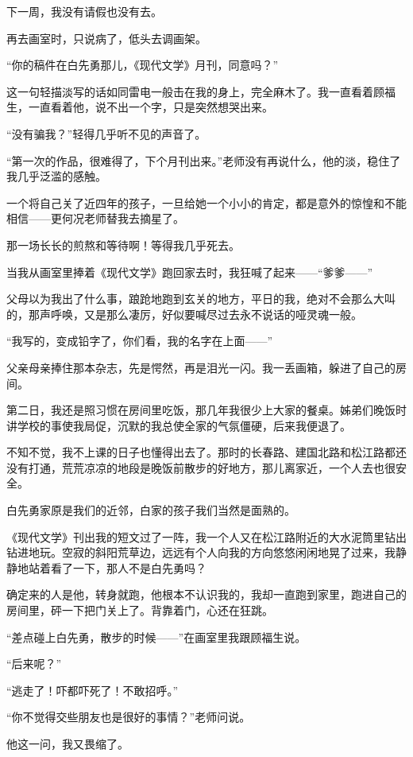 \par 下一周，我没有请假也没有去。
\par 再去画室时，只说病了，低头去调画架。
\par “你的稿件在白先勇那儿，《现代文学》月刊，同意吗？”
\par 这一句轻描淡写的话如同雷电一般击在我的身上，完全麻木了。我一直看着顾福生，一直看着他，说不出一个字，只是突然想哭出来。
\par “没有骗我？”轻得几乎听不见的声音了。
\par “第一次的作品，很难得了，下个月刊出来。”老师没有再说什么，他的淡，稳住了我几乎泛滥的感触。
\par 一个将自己关了近四年的孩子，一旦给她一个小小的肯定，都是意外的惊惶和不能相信——更何况老师替我去摘星了。
\par 那一场长长的煎熬和等待啊！等得我几乎死去。
\par 当我从画室里捧着《现代文学》跑回家去时，我狂喊了起来——“爹爹——”
\par 父母以为我出了什么事，踉跄地跑到玄关的地方，平日的我，绝对不会那么大叫的，那声呼唤，又是那么凄厉，好似要喊尽过去永不说话的哑灵魂一般。
\par “我写的，变成铅字了，你们看，我的名字在上面——”
\par 父亲母亲捧住那本杂志，先是愕然，再是泪光一闪。我一丢画箱，躲进了自己的房间。
\par 第二日，我还是照习惯在房间里吃饭，那几年我很少上大家的餐桌。姊弟们晚饭时讲学校的事使我局促，沉默的我总使全家的气氛僵硬，后来我便退了。
\par 不知不觉，我不上课的日子也懂得出去了。那时的长春路、建国北路和松江路都还没有打通，荒荒凉凉的地段是晚饭前散步的好地方，那儿离家近，一个人去也很安全。
\par 白先勇家原是我们的近邻，白家的孩子我们当然是面熟的。
\par 《现代文学》刊出我的短文过了一阵，我一个人又在松江路附近的大水泥筒里钻出钻进地玩。空寂的斜阳荒草边，远远有个人向我的方向悠悠闲闲地晃了过来，我静静地站着看了一下，那人不是白先勇吗？
\par 确定来的人是他，转身就跑，他根本不认识我的，我却一直跑到家里，跑进自己的房间里，砰一下把门关上了。背靠着门，心还在狂跳。
\par “差点碰上白先勇，散步的时候——”在画室里我跟顾福生说。
\par “后来呢？”
\par “逃走了！吓都吓死了！不敢招呼。”
\par “你不觉得交些朋友也是很好的事情？”老师问说。
\par 他这一问，我又畏缩了。

